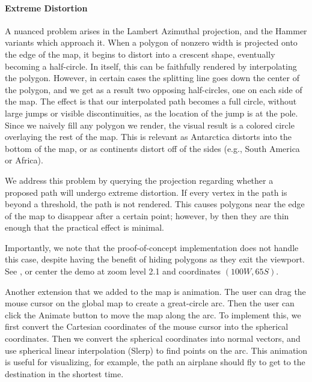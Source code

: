 \paragraph{Extreme Distortion}
A nuanced problem arises in the Lambert Azimuthal projection, and the Hammer
  variants which approach it.
When a polygon of nonzero width is projected onto the edge of the map, it
  begins to distort into a crescent shape, eventually becoming a half-circle.
In itself, this can be faithfully rendered by interpolating the polygon.
However, in certain cases the splitting line goes down the center of the
  polygon, and we get as a result two opposing half-circles, one on each side
  of the map.
The effect is that our interpolated path becomes a full circle, without large
  jumps or visible discontinuities, as the location of the jump is at the pole.
Since we naively fill any polygon we render, the visual result is a colored
  circle overlaying the rest of the map.
This is relevant as Antarctica distorts into the bottom of the map, or as
  continents distort off of the sides (e.g., South America or Africa).

We address this problem by querying the projection regarding whether a
  proposed path will undergo extreme distortion.
If every vertex in the path is beyond a threshold, the path is not rendered.
This causes polygons near the edge of the map to disappear after a certain
  point; however, by then they are thin enough that the practical effect is
  minimal.

Importantly, we note that the proof-of-concept implementation does not handle
  this case, despite having the benefit of hiding polygons as they exit the
  viewport.
See , or center the demo at zoom level 2.1 and coordinates
  $(100W, 65S)$.



Another extension that we added to the map is animation. The user can drag the mouse cursor on the global map to create a great-circle arc. Then the user can click the Animate button to move the map along the arc. To implement this, we first convert the Cartesian coordinates of the mouse cursor into the spherical coordinates. Then we convert the spherical coordinates into normal vectors, and use spherical linear interpolation (Slerp) to find points on the arc. This animation is useful for visualizing, for example, the path an airplane should fly to get to the destination in the shortest time.


